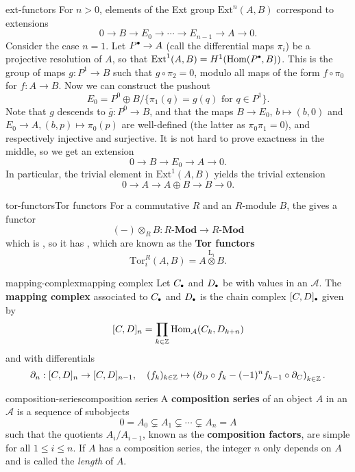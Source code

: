 \begin{example}{ext-functors}
    For $n > 0$, elements of the Ext group $\text{Ext}^n(A, B)$ correspond to extensions
    \[ 0 \to B \to E_0 \to \cdots \to E_{n - 1} \to A \to 0 . \]
    Consider the case $n = 1$. Let $P^\bdot \to A$ (call the differential maps $\pi_i$) be a projective resolution of $A$, so that $\text{Ext}^1(A, B) = H^1(\Hom(P^\bdot, B))$. This is the group of maps $g : P^1 \to B$ such that $g \circ \pi_2 = 0$, modulo all maps of the form $f \circ \pi_0$ for $f : A \to B$. Now we can construct the pushout
    \[ E_0 = P^0 \oplus B / \{ \pi_1(q) = g(q) \text{ for } q \in P^1 \} . \]
    Note that $g$ descends to $\overline{g} : P^0 \to B$, and that the maps $B \to E_0$, $b \mapsto (b, 0)$ and $E_0 \to A, (b, p) \mapsto \pi_0(p)$ are well-defined (the latter as $\pi_0 \pi_1 = 0$), and respectively injective and surjective. It is not hard to prove exactness in the middle, so we get an extension
    \[ 0 \to B \to E_0 \to A \to 0 . \]
    In particular, the trivial element in $\text{Ext}^1(A, B)$ yields the trivial extension
    \[ 0 \to A \to A \oplus B \to B \to 0 . \]
\end{example}

\begin{topic}{tor-functors}{Tor functors}
    For a commutative  $R$ and an $R$-module $B$, the  gives a functor
    \[ (-) \otimes_R B : R\textbf{-Mod} \to R\textbf{-Mod} \]
    which is , so it has , which are known as the \textbf{Tor functors}
    \[ \text{Tor}^R_i(A, B) = A \overset{\text{L}_i}{\otimes} B . \]
\end{topic}

\begin{topic}{mapping-complex}{mapping complex}
    Let $C_\bdot$ and $D_\bdot$ be  with values in an  $\mathcal{A}$. The \textbf{mapping complex} associated to $C_\bdot$ and $D_\bdot$ is the chain complex $[C, D] _\bdot$ given by
    \[ [C, D]_n = \prod_{k \in \mathbb{Z}} \text{Hom}_\mathcal{A}(C_k, D_{k + n}) \]
    and with differentials
    \[ \partial_n : [C, D]_n \to [C, D]_{n - 1}, \quad (f_k)_{k \in \mathbb{Z}} \mapsto \left(\partial_D \circ f_k - (-1)^n f_{k - 1} \circ \partial_C \right)_{k \in \mathbb{Z}} . \]
\end{topic}

\begin{topic}{composition-series}{composition series}
    A \textbf{composition series} of an object $A$ in an  $\mathcal{A}$ is a sequence of subobjects
    \[ 0 = A_0 \subsetneq A_1 \subsetneq \cdots \subsetneq A_n = A \]
    such that the quotients $A_i/A_{i - 1}$, known as the \textbf{composition factors}, are simple for all $1 \le i \le n$. If $A$ has a composition series, the integer $n$ only depends on $A$ and is called the \textit{length} of $A$.
\end{topic}

